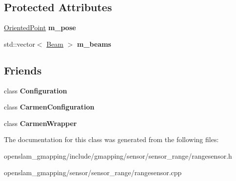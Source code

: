\subsection*{Protected Attributes}
\begin{DoxyCompactItemize}
\item 
\mbox{\label{classGMapping_1_1RangeSensor_a8008abe1dafd518b095c05b9d9dad24d}} 
\hyperlink{structGMapping_1_1orientedpoint}{Oriented\+Point} {\bfseries m\+\_\+pose}
\item 
\mbox{\label{classGMapping_1_1RangeSensor_a83bf5a2dd17929fb46b62b589f29825e}} 
std\+::vector$<$ \hyperlink{structGMapping_1_1RangeSensor_1_1Beam}{Beam} $>$ {\bfseries m\+\_\+beams}
\end{DoxyCompactItemize}
\subsection*{Friends}
\begin{DoxyCompactItemize}
\item 
\mbox{\label{classGMapping_1_1RangeSensor_a30221ddc558692a7b52598b963a74bc2}} 
class {\bfseries Configuration}
\item 
\mbox{\label{classGMapping_1_1RangeSensor_a09f1dc78bbac19dbdb1bc6ee6fb44ed1}} 
class {\bfseries Carmen\+Configuration}
\item 
\mbox{\label{classGMapping_1_1RangeSensor_afe9c5ce6f93950026cd9f3f18a3fa9f6}} 
class {\bfseries Carmen\+Wrapper}
\end{DoxyCompactItemize}


The documentation for this class was generated from the following files\+:\begin{DoxyCompactItemize}
\item 
openslam\+\_\+gmapping/include/gmapping/sensor/sensor\+\_\+range/rangesensor.\+h\item 
openslam\+\_\+gmapping/sensor/sensor\+\_\+range/rangesensor.\+cpp\end{DoxyCompactItemize}

